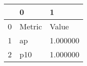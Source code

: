 \begin{tabular}{lll}
\toprule
 & 0 & 1 \\
\midrule
0 & Metric & Value \\
1 & ap & 1.000000 \\
2 & p10 & 1.000000 \\
\bottomrule
\end{tabular}
